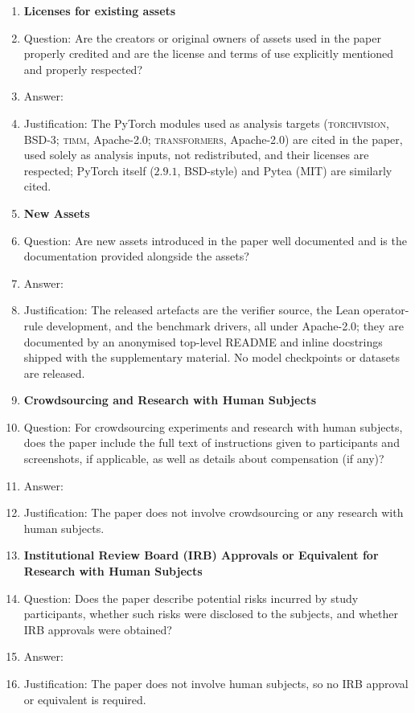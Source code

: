 \begin{enumerate}
\item {\bf Licenses for existing assets}
    \item[] Question: Are the creators or original owners of assets used in the paper properly credited and are the license and terms of use explicitly mentioned and properly respected?
    \item[] Answer: \answerYes{}
    \item[] Justification: The PyTorch modules used as analysis targets (\textsc{torchvision}, BSD-3; \textsc{timm}, Apache-2.0; \textsc{transformers}, Apache-2.0) are cited in the paper, used solely as analysis inputs, not redistributed, and their licenses are respected; PyTorch itself ($2.9.1$, BSD-style) and Pytea (MIT) are similarly cited.

\item {\bf New Assets}
    \item[] Question: Are new assets introduced in the paper well documented and is the documentation provided alongside the assets?
    \item[] Answer: \answerYes{}
    \item[] Justification: The released artefacts are the verifier source, the Lean operator-rule development, and the benchmark drivers, all under Apache-2.0; they are documented by an anonymised top-level README and inline docstrings shipped with the supplementary material. No model checkpoints or datasets are released.

\item {\bf Crowdsourcing and Research with Human Subjects}
    \item[] Question: For crowdsourcing experiments and research with human subjects, does the paper include the full text of instructions given to participants and screenshots, if applicable, as well as details about compensation (if any)?
    \item[] Answer: \answerNA{}
    \item[] Justification: The paper does not involve crowdsourcing or any research with human subjects.

\item {\bf Institutional Review Board (IRB) Approvals or Equivalent for Research with Human Subjects}
    \item[] Question: Does the paper describe potential risks incurred by study participants, whether such risks were disclosed to the subjects, and whether IRB approvals were obtained?
    \item[] Answer: \answerNA{}
    \item[] Justification: The paper does not involve human subjects, so no IRB approval or equivalent is required.

\end{enumerate}
